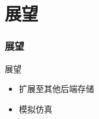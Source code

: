 \documentclass[14pt, AutoFakeBold]{ldr}
\begin{document}







\section{展望}
\begin{frame}
  \frametitle{展望}
  展望
  \begin{itemize}
    \item 扩展至其他后端存储
    \item 模拟仿真
  \end{itemize}
\end{frame}


\end{document}
